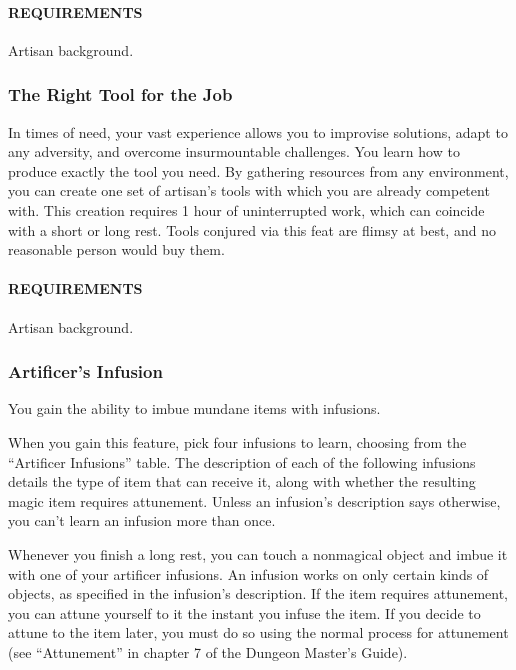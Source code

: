        \paragraph{REQUIREMENTS} Artisan background.

    \subsubsection{The Right Tool for the Job} \label{feat::therighttoolforthejob}
        In times of need, your vast experience allows you to improvise solutions, adapt to any adversity, and overcome insurmountable challenges.
        You learn how to produce exactly the tool you need.
        By gathering resources from any environment, you can create one set of artisan's tools with which you are already competent with.
        This creation requires 1 hour of uninterrupted work, which can coincide with a short or long rest.
        Tools conjured via this feat are flimsy at best, and no reasonable person would buy them.
        \paragraph{REQUIREMENTS} Artisan background.

    \subsubsection{Artificer's Infusion} \label{feat::artificersinfusion}
        You gain the ability to imbue mundane items with infusions.

        When you gain this feature, pick four infusions to learn, choosing from the ``Artificer Infusions'' table.
        The description of each of the following infusions details the type of item that can receive it, along with whether the resulting magic item requires attunement.
        Unless an infusion's description says otherwise, you can't learn an infusion more than once.

        Whenever you finish a long rest, you can touch a nonmagical object and imbue it with one of your artificer infusions.
        An infusion works on only certain kinds of objects, as specified in the infusion's description.
        If the item requires attunement, you can attune yourself to it the instant you infuse the item.
        If you decide to attune to the item later, you must do so using the normal process for attunement (see ``Attunement'' in chapter 7 of the Dungeon Master's Guide).

